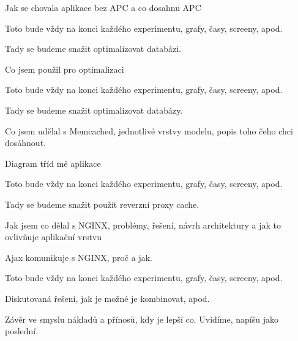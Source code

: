 \documentclass[12pt]{article}
\begin{document}
Jak se chovala aplikace bez APC a co dosahnu APC

Toto bude vždy na konci každého experimentu, grafy, časy, screeny, apod.

Tady se budeme snažit optimalizovat databázi.

Co jsem použil pro optimalizaci

Toto bude vždy na konci každého experimentu, grafy, časy, screeny, apod.

Tady se budeme snažit optimalizovat databázy.

Co jsem udělal s Memcached, jednotlivé vrstvy modelu, popis toho čeho chci dosáhnout.

Diagram tříd mé aplikace

Toto bude vždy na konci každého experimentu, grafy, časy, screeny, apod.

Tady se budeme snažit použít reverzní proxy cache.

Jak jsem co dělal s NGINX, problémy, řešení, návrh architektury a jak to ovlivňuje aplikační vrstvu

Ajax komunikuje s NGINX, proč a jak.

Toto bude vždy na konci každého experimentu, grafy, časy, screeny, apod.



Diskutovaná řešení, jak je možné je kombinovat, apod.



Závěr ve smyslu nákladů a přínosů, kdy je lepší co. Uvidíme, napíšu jako poslední.
\end{document}
